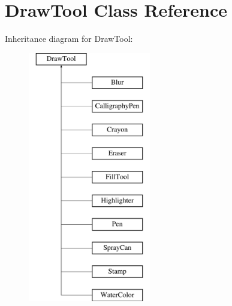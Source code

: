 \hypertarget{classDrawTool}{\section{Draw\-Tool Class Reference}
\label{classDrawTool}
}
Inheritance diagram for Draw\-Tool\-:\begin{figure}[H]
\begin{center}
\leavevmode
\includegraphics[height=11.000000cm]{classDrawTool}
\end{center}
\end{figure}
